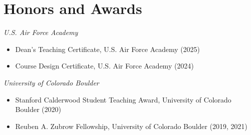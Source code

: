 \documentclass[letterpaper]{article}
\begin{document}
\section*{Honors and Awards}
  \textit{U.S. Air Force Academy}
  \begin{itemize}[topsep=2pt,itemsep=-1pt,leftmargin=1em]
    \item[] Dean's Teaching Certificate, U.S. Air Force Academy (2025)
    \item[] Course Design Certificate, U.S. Air Force Academy (2024)
  \end{itemize}
  \vspace*{.5em}
\textit{University of Colorado Boulder}
  \begin{itemize}[topsep=2pt,itemsep=-1pt,leftmargin=1em]
    \item[] Stanford Calderwood Student Teaching Award, University of Colorado Boulder (2020)
    \item[] Reuben A. Zubrow Fellowship, University of Colorado Boulder (2019, 2021)
  \end{itemize}
\end{document}

